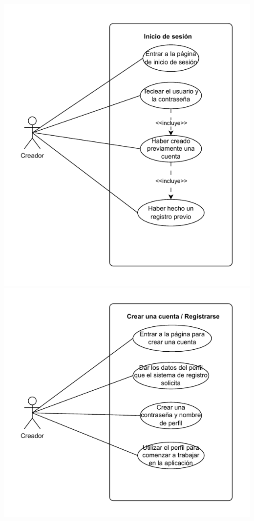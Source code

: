 \documentclass[a4paper, oneside, final]{scrartcl}
\begin{document}
\includegraphics[width=\textwidth]{images/CasoUso4-1.pdf}
\includegraphics[width=\textwidth]{images/CasoUso5.pdf}
\end{document}
